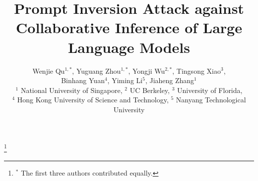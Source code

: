 \documentclass[conference,compsoc]{IEEEtran}
\begin{document}
%
\title{Prompt Inversion Attack against Collaborative Inference of Large Language Models}


\author{
    Wenjie Qu$^{1,*}$, Yuguang Zhou$^{1,*}$, Yongji Wu$^{2,*}$, Tingsong Xiao$^{3}$,\\
    Binhang Yuan$^{4}$, Yiming Li$^{5}$, Jiaheng Zhang$^{1}$ \\
    { $^{1}$ National University of Singapore, $^{2}$ UC Berkeley, $^{3}$ University of Florida,}\\
    { $^{4}$ Hong Kong University of Science and Technology, $^{5}$ Nanyang Technological University} 
}


\maketitle


\renewcommand{\thefootnote}{}

\footnote{$^*$ The first three authors contributed equally.}


%



\IEEEpeerreviewmaketitle


























\end{document}
